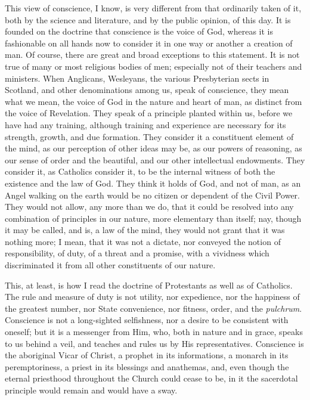 This view of conscience, I know, is very different from that
ordinarily taken of it, both by the science and literature, and by the
public opinion, of this day. It is founded on the doctrine that
conscience is the voice of God, whereas it is fashionable on all hands
now to consider it in one way or another a creation of man. Of course,
there are great and broad exceptions to this statement. It is not true
of many or most religious bodies of men; especially not of their
teachers and ministers. When Anglicans, Wesleyans, the various
Presbyterian sects in Scotland, and other denominations among us, speak
of conscience, they mean what we mean, the voice of God in the nature
and heart of man, as distinct from the voice of Revelation. They
speak of a principle planted within us, before we have had any training,
although training and experience are necessary for its strength, growth,
and due formation. They consider it a constituent element of the mind,
as our perception of other ideas may be, as our powers of reasoning, as
our sense of order and the beautiful, and our other intellectual
endowments. They consider it, as Catholics consider it, to be the
internal witness of both the existence and the law of God. They think it
holds of God, and not of man, as an Angel walking on the earth would be
no citizen or dependent of the Civil Power. They would not allow, any
more than we do, that it could be resolved into any combination of
principles in our nature, more elementary than itself; nay, though it
may be called, and is, a law of the mind, they would not grant that it
was nothing more; I mean, that it was not a dictate, nor conveyed the
notion of responsibility, of duty, of a threat and a promise, with a
vividness which discriminated it from all other constituents of our
nature.

This, at least, is how I read the doctrine of Protestants as well as
of Catholics. The rule and measure of duty is not utility, nor
expedience, nor the happiness of the greatest number, nor State
convenience, nor fitness, order, and the \emph{pulchrum}. Conscience is
not a long-sighted selfishness, nor a desire to be consistent with
oneself; but it is a messenger from Him, who, both in nature and in
grace, speaks to us behind a veil, and teaches and rules us by His
representatives. Conscience is the aboriginal Vicar of Christ, a prophet
in its informations, a monarch in its peremptoriness, a priest in its
blessings and anathemas, and, even though the eternal priesthood
throughout the Church could cease to be, in it the sacerdotal principle
would remain and would have a sway.

